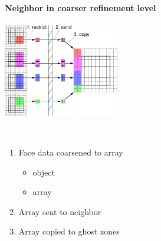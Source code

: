 
\begin{frame}[fragile]
\secframetitle{\ssRefresh}
\framesubtitle{Neighbor in coarser refinement level}
\begin{minipage}{2.0in}
\begin{center}
   \includegraphics[width=2.0in]{refresh-coarse.pdf} \ \\
\end{center}
\end{minipage} \ 
\begin{minipage}{2.1in}
\begin{enumerate}
\item Face data coarsened to array
\begin{itemize}
\item {} object
\item {} array
\end{itemize}
\item Array sent to neighbor
\item Array copied to ghost zones
\end{enumerate}
\end{minipage}
\end{frame}


